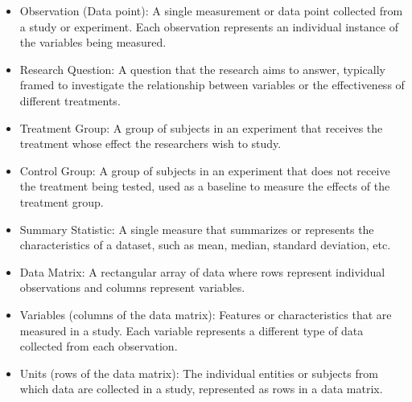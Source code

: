 \documentclass{article}
\begin{document}
\begin{itemize}
    \item Observation (Data point): A single measurement or data point collected from a study or experiment. Each observation represents an individual instance of the variables being measured.
    
    \item Research Question: A question that the research aims to answer, typically framed to investigate the relationship between variables or the effectiveness of different treatments.
    
    \item Treatment Group: A group of subjects in an experiment that receives the treatment whose effect the researchers wish to study.
    
    \item Control Group: A group of subjects in an experiment that does not receive the treatment being tested, used as a baseline to measure the effects of the treatment group.
    
    \item Summary Statistic: A single measure that summarizes or represents the characteristics of a dataset, such as mean, median, standard deviation, etc.
    
    \item Data Matrix: A rectangular array of data where rows represent individual observations and columns represent variables.
    
    \item Variables (columns of the data matrix): Features or characteristics that are measured in a study. Each variable represents a different type of data collected from each observation.
    
    \item Units (rows of the data matrix): The individual entities or subjects from which data are collected in a study, represented as rows in a data matrix.
    

\end{itemize}
\end{document}
